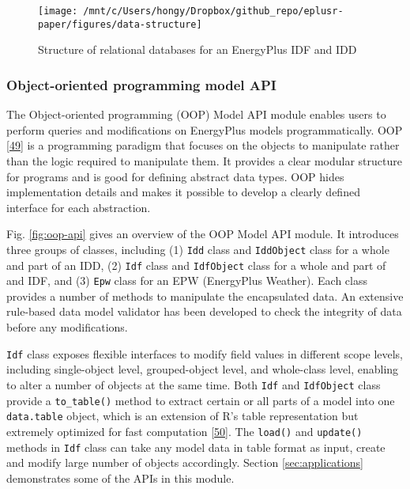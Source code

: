 \documentclass[3p, times]{elsarticle} %
\begin{document}
\begin{figure}[!htb]
\texttt{[image: /mnt/c/Users/hongy/Dropbox/github\_repo/eplusr-paper/figures/data-structure]} \caption{Structure of relational databases for an EnergyPlus IDF and IDD}\label{fig:data-structure}
\end{figure}

\hypertarget{object-oriented-programming-model-api}{%
\subsubsection{Object-oriented programming model API}\label{object-oriented-programming-model-api}}

The Object-oriented programming (OOP) Model API module enables users to perform
queries and modifications on EnergyPlus models programmatically. OOP
{[}\protect\hyperlink{ref-Wikipedia2020}{49}{]} is a programming paradigm that focuses on the objects to
manipulate rather than the logic required to manipulate them. It provides a
clear modular structure for programs and is good for defining abstract data
types. OOP hides implementation details and makes it possible to develop a
clearly defined interface for each abstraction.

Fig. \ref{fig:oop-api} gives an overview of the OOP Model API module. It
introduces three groups of classes, including (1) \texttt{Idd} class and \texttt{IddObject}
class for a whole and part of an IDD, (2) \texttt{Idf} class and \texttt{IdfObject} class for
a whole and part of and IDF, and (3) \texttt{Epw} class for an EPW (EnergyPlus
Weather). Each class provides a number of methods to manipulate the encapsulated
data. An extensive rule-based data model validator has been developed to check
the integrity of data before any modifications.

\texttt{Idf} class exposes flexible interfaces to modify field values in different
scope levels, including single-object level, grouped-object level, and
whole-class level, enabling to alter a number of objects at the same time. Both
\texttt{Idf} and \texttt{IdfObject} class provide a \texttt{to\_table()} method to extract certain or
all parts of a model into one \texttt{data.table} object, which is an extension of R's
table representation but extremely optimized for fast computation {[}\protect\hyperlink{ref-Dowle2019}{50}{]}.
The \texttt{load()} and \texttt{update()} methods in \texttt{Idf} class can take any model data in
table format as input, create and modify large number of objects accordingly.
Section \ref{sec:applications} demonstrates some of the APIs in this module.
\end{document}
